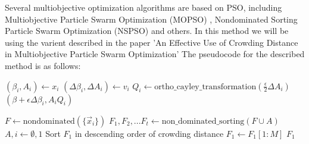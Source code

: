  Several multiobjective optimization algorithms are based on PSO, including Multiobjective Particle Swarm Optimization (MOPSO) \cite{coello2004handling}, Nondominated Sorting Particle Swarm Optimization (NSPSO) \cite{li2003non} and others. In this method we will be using the varient described in the paper 'An Effective Use of Crowding Distance in Multiobjective Particle Swarm Optimization' \cite{raquel2005effective} \newline The pseudocode for the described method is as follows:

 \begin{algorithm}[H]
\caption{$\text{update\_position}[\epsilon](\vec{x}_i,\vec{v}_i)$}
\label{update_pos}
\begin{algorithmic}[1]
\State $(\beta_i,A_i) \gets x_i$
\State $(\Delta \beta_i,\Delta A_i) \gets v_i$
\State $Q_i \gets \text{ortho\_cayley\_transformation}(\frac{\epsilon}{2}\Delta A_i)$
\State \Return $(\beta+\epsilon \Delta \beta_i,A_iQ_i)$
\end{algorithmic}
\end{algorithm}

\begin{algorithm}[H]
\caption{$\text{nondominated\_merge}[M](A, \{\vec{x}_i\})$}
\label{mopso_non_dominated_merge}
\begin{algorithmic}[1]
\State $F \gets \text{nondominated}(\{\vec{x}_i\})$
\State $F_1,F_2,...F_t \gets \text{non\_dominated\_sorting}(F\cup A)$
\State $A , i \gets \emptyset, 1 $
\State Sort $F_1$ in descending order of crowding distance
\State $F_1 \gets F_1[1:M]$ 
\EndIf
\State \Return $F_1$
\end{algorithmic}
\end{algorithm}

